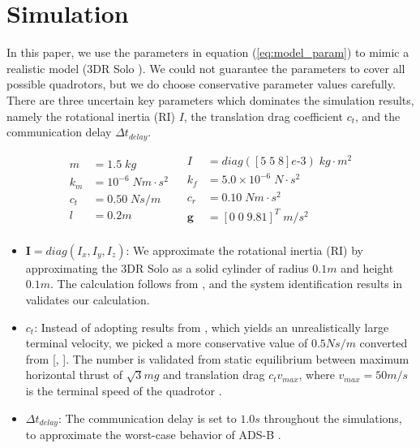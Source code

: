 \documentclass[journal,11pt,onecolumn,draftclsnofoot,]{IEEEtran}
\begin{document}
\section{\textbf{Simulation}} \label{sec:simulation}


In this paper, we use the parameters in equation (\ref{eq:model_param}) to mimic a realistic model (3DR Solo \cite{3dr_solo}). We could not guarantee the parameters to cover all possible quadrotors, but we do choose conservative parameter values carefully. There are three uncertain key parameters which dominates the simulation results, namely the rotational inertia (RI) $I$, the translation drag coefficient $c_t$, and the communication delay $\Delta t_{delay}$.

\begin{equation}
\label{eq:model_param}
\begin{aligned}
m &= 1.5 \; kg \\
k_m &= 10^{-6} \; Nm \cdot s^2 \;\;\; \\
c_t &=  0.50 \; Ns/m \;\;\;\\
l &= 0.2 m \\
\end{aligned}
\begin{aligned}
I &= diag([5 \; 5 \; 8]e\text{-}3) \; kg \cdot m^2 \\
k_f &= 5.0 \times 10^{-6} \; N \cdot s^2 \\
c_r &= 0.10 \; Nm \cdot s^2 \\
\boldsymbol{g} &= \left[0 \; 0\; 9.81 \right]^T \; m/s^2 \\
\end{aligned}
\end{equation}

\begin{itemize}
	\item $\boldsymbol{I}=diag(I_x,I_y,I_z)$: We approximate the rotational inertia (RI) by approximating the 3DR Solo as a solid cylinder of radius $0.1m$ and height $0.1m$. The calculation follows from \cite{beer1972statics}, and the system identification results in \cite{bouadi2011adaptive} validates our calculation.
	
	\item $c_t$: Instead of adopting results from \cite{bouadi2011adaptive}, which yields an unrealistically large terminal velocity, we picked a more conservative value of $0.5 Ns/m$ converted from [, ]. The number is validated from static equilibrium between maximum horizontal thrust of $\sqrt{3}mg$ and translation drag $c_t v_{max}$, where $v_{max}=50m/s$ is the terminal speed of the quadrotor \cite{quadrotor_common_speed}.
	
	\item $\Delta t_{delay}$: The communication delay is set to $1.0 s$ throughout the simulations, to approximate the worst-case behavior of ADS-B \cite{helfrick2010principles}.
\end{itemize}
\end{document}
